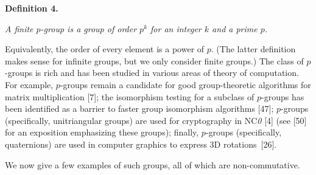 \documentclass[10pt,a4paper]{article}
\begin{document}


\par\medskip\noindent\textbf{
\textbf{Definition 4}\textbf{.}
}\par



\emph{A finite $p$-group is a group of order $p^{k}$ for an integer $k$
and a prime $p$.}\par






Equivalently, the order of every element is a power of $p$. (The
latter definition makes sense for infinite groups, but we only consider
finite groups.) The class of $p$-groups is rich and has been studied in
various areas of theory of computation. For example, $p$-groups remain
a candidate for good group-theoretic algorithms for matrix multiplication
[7]; the isomorphism testing
for a subclass of $p$-groups has been identified as a barrier to
faster group isomorphism algorithms [47];
$p$-groups (specifically, unitriangular groups) are used for cryptography
in NC\emph{0} [4] (see [50] for
an exposition emphasizing these groups); finally, $p$-groups (specifically,
quaternions) are used in computer graphics to express 3D rotations [26].\par




We now give a few examples of such groups, all of which are non-commutative.\par
\end{document}
